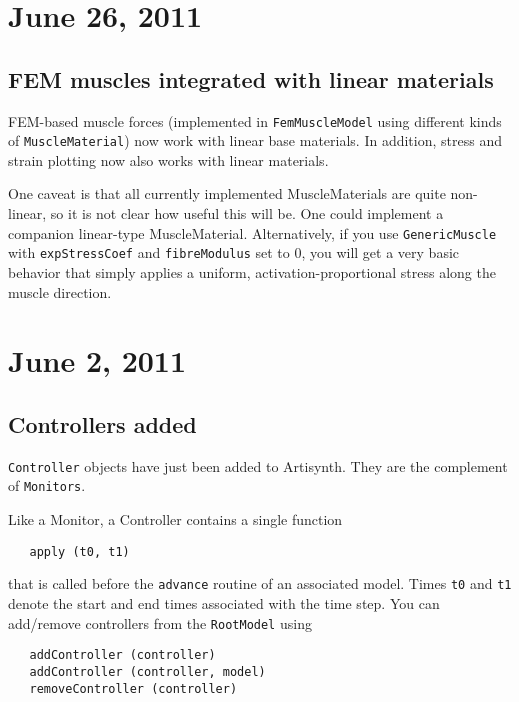 \documentclass{article}
\begin{document}
\section*{June 26, 2011}

\subsection*{FEM muscles integrated with linear materials}

FEM-based muscle forces (implemented in {\tt FemMuscleModel} using
different kinds of {\tt MuscleMaterial}) now work with linear base
materials. In addition, stress and strain plotting now also works with
linear materials.

One caveat is that all currently implemented MuscleMaterials are quite
non-linear, so it is not clear how useful this will be.  One could
implement a companion linear-type MuscleMaterial.  Alternatively, if
you use {\tt GenericMuscle} with {\tt expStressCoef} and {\tt fibreModulus} set to
0, you will get a very basic behavior that simply applies a uniform,
activation-proportional stress along the muscle direction.

\section*{June 2, 2011}

\subsection*{Controllers added}

{\tt Controller} objects have just been added to Artisynth. They are the
complement of {\tt Monitors}. 

Like a Monitor, a Controller contains a single function 

\begin{lstlisting}
   apply (t0, t1)
\end{lstlisting}

that is called before the {\tt advance} routine of an associated model.
Times {\tt t0} and {\tt t1} denote the start and end times associated with the
time step. You can add/remove controllers from the {\tt RootModel}
using 

\begin{lstlisting}
   addController (controller)
   addController (controller, model)
   removeController (controller)
\end{lstlisting}
\end{document}
